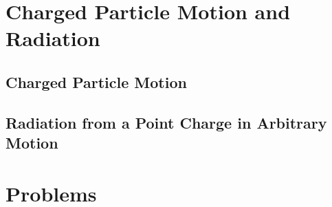 \section{Charged Particle Motion and Radiation}\label{sec:8.3}

\subsection{Charged Particle Motion}\label{ssec:8.3.1}

\subsection{Radiation from a Point Charge in Arbitrary Motion}\label{ssec:8.3.2}


\section*{Problems}


